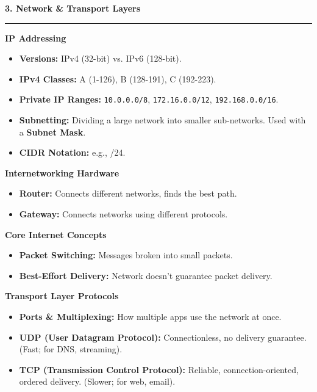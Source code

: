\documentclass[a4paper, 8pt]{extarticle}
\newcommand{\sectionheading}[1]{\large\textbf{#1}\par\noindent\rule{\linewidth}{0.4pt}}
\newcommand{\subsectionheading}[1]{\normalsize\textbf{#1}}
\begin{document}
\begin{multicols}{2}
\sectionheading{3. Network \& Transport Layers}
\vspace{0.5em}
\subsectionheading{IP Addressing}
\begin{itemize}
    \item \textbf{Versions:} IPv4 (32-bit) vs. IPv6 (128-bit).
    \item \textbf{IPv4 Classes:} A (1-126), B (128-191), C (192-223).
    \item \textbf{Private IP Ranges:} \texttt{10.0.0.0/8}, \texttt{172.16.0.0/12}, \texttt{192.168.0.0/16}.
    \item \textbf{Subnetting:} Dividing a large network into smaller sub-networks. Used with a \textbf{Subnet Mask}.
    \item \textbf{CIDR Notation:} e.g., /24.
\end{itemize}
\subsectionheading{Internetworking Hardware}
\begin{itemize}
    \item \textbf{Router:} Connects different networks, finds the best path.
    \item \textbf{Gateway:} Connects networks using different protocols.
\end{itemize}
\subsectionheading{Core Internet Concepts}
\begin{itemize}
    \item \textbf{Packet Switching:} Messages broken into small packets.
    \item \textbf{Best-Effort Delivery:} Network doesn't guarantee packet delivery.
\end{itemize}
\subsectionheading{Transport Layer Protocols}
\begin{itemize}
    \item \textbf{Ports \& Multiplexing:} How multiple apps use the network at once.
    \item \textbf{UDP (User Datagram Protocol):} Connectionless, no delivery guarantee. (Fast; for DNS, streaming).
    \item \textbf{TCP (Transmission Control Protocol):} Reliable, connection-oriented, ordered delivery. (Slower; for web, email).
\end{itemize}


\end{multicols}
\end{document}
